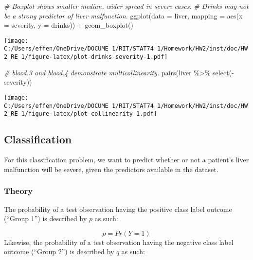 \documentclass[
  11pt,
  a4paper,
]{scrartcl}
\newenvironment{Shaded}{\begin{snugshade}}{\end{snugshade}}
\newcommand{\AttributeTok}[1]{\textcolor[rgb]{0.77,0.63,0.00}{#1}}
\newcommand{\CommentTok}[1]{\textcolor[rgb]{0.56,0.35,0.01}{\textit{#1}}}
\newcommand{\FunctionTok}[1]{\textcolor[rgb]{0.00,0.00,0.00}{#1}}
\newcommand{\NormalTok}[1]{#1}
\newcommand{\SpecialCharTok}[1]{\textcolor[rgb]{0.00,0.00,0.00}{#1}}
\begin{document}
\begin{Shaded}
\begin{Highlighting}[]
\CommentTok{\# Boxplot shows smaller median, wider spread in severe cases.}
\CommentTok{\# Drinks may not be a strong predictor of liver malfunction.}
\FunctionTok{ggplot}\NormalTok{(}\AttributeTok{data =}\NormalTok{ liver, }\AttributeTok{mapping =} \FunctionTok{aes}\NormalTok{(}\AttributeTok{x =}\NormalTok{ severity, }\AttributeTok{y =}\NormalTok{ drinks)) }\SpecialCharTok{+}
  \FunctionTok{geom\_boxplot}\NormalTok{()}
\end{Highlighting}
\end{Shaded}

\texttt{[image: C:/Users/effen/OneDrive/DOCUME~1/RIT/STAT74~1/Homework/HW2/inst/doc/HW2\_RE~1/figure-latex/plot-drinks-severity-1.pdf]}

\begin{Shaded}
\begin{Highlighting}[]
\CommentTok{\# blood.3 and blood.4 demonstrate multicollinearity.}
\FunctionTok{pairs}\NormalTok{(liver }\SpecialCharTok{\%\textgreater{}\%} \FunctionTok{select}\NormalTok{(}\SpecialCharTok{{-}}\NormalTok{severity))}
\end{Highlighting}
\end{Shaded}

\texttt{[image: C:/Users/effen/OneDrive/DOCUME~1/RIT/STAT74~1/Homework/HW2/inst/doc/HW2\_RE~1/figure-latex/plot-collinearity-1.pdf]}

\newpage

\hypertarget{classification}{%
\subsection{Classification}\label{classification}}

For this classification problem, we want to predict whether or not a
patient's liver malfunction will be severe, given the predictors
available in the dataset.

\hypertarget{theory}{%
\subsubsection{Theory}\label{theory}}

The probability of a test observation having the positive class label
outcome (``Group 1'') is described by \(p\) as such:

\[
p = Pr(Y = 1)
\] Likewise, the probability of a test observation having the negative
class label outcome (``Group 2'') is described by \(q\) as such:
\end{document}
